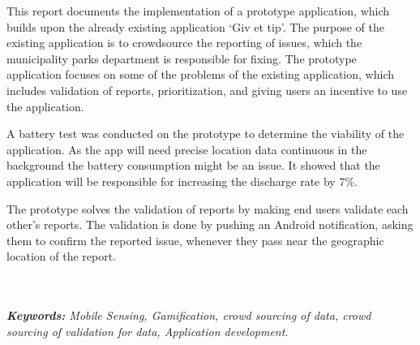 
{\noindent This report documents the implementation of a prototype application, which builds upon the already existing application ‘Giv et tip’. The purpose of the existing application is to crowdsource the reporting of issues, which the municipality parks department is responsible for fixing. The prototype application focuses on some of the problems of the existing application, which includes validation of reports, prioritization, and giving users an incentive to use the application.}

{\noindent A battery test was conducted on the prototype to determine the viability of the application. As the app will need precise location data continuous in the background the battery consumption might be an issue. It showed that the application will be responsible for increasing the discharge rate by 7\%.}

{\noindent The prototype solves the validation of reports by making end users validate each other's reports. The validation is done by pushing an Android notification, asking them to confirm the reported issue, whenever they pass near the geographic location of the report.}


~\\~\\
{\noindent \textit{\textbf{Keywords:} Mobile Sensing, Gamification, crowd sourcing of data, crowd sourcing of validation for data, Application development.}}